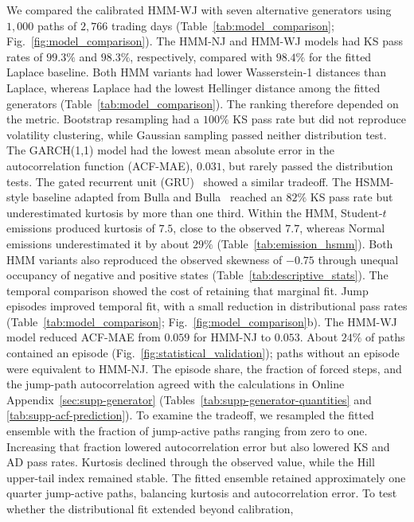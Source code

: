 We compared the calibrated HMM-WJ with seven alternative generators
using $1{,}000$ paths of $2{,}766$ trading days
(Table~\ref{tab:model_comparison}; Fig.~\ref{fig:model_comparison}).
The HMM-NJ and HMM-WJ models had KS pass rates of $99.3\%$ and
$98.3\%$, respectively, compared with $98.4\%$ for the fitted
Laplace baseline. Both HMM variants had lower Wasserstein-1 distances
than Laplace, whereas Laplace had the lowest Hellinger distance among
the fitted generators (Table~\ref{tab:model_comparison}). The
ranking therefore depended on the metric. Bootstrap resampling had a
$100\%$ KS pass rate but did not reproduce volatility clustering,
while Gaussian sampling passed neither distribution test.
The GARCH(1,1) model had the lowest mean absolute error in the
autocorrelation function (ACF-MAE), $0.031$, but rarely passed the
distribution tests. The gated recurrent unit (GRU)~\cite{choEtAl2014gru}
showed a similar tradeoff. The HSMM-style baseline adapted from Bulla
and Bulla~\cite{bullaBulla2006} reached an $82\%$ KS pass rate but
underestimated kurtosis by more than one third. Within the HMM,
Student-$t$ emissions produced kurtosis of $7.5$, close to the
observed $7.7$, whereas Normal emissions underestimated it by about
$29\%$ (Table~\ref{tab:emission_hsmm}). Both HMM variants also
reproduced the observed skewness of $-0.75$ through unequal occupancy
of negative and positive states (Table~\ref{tab:descriptive_stats}).
The temporal comparison showed the cost of retaining that marginal fit.
Jump episodes improved temporal fit, with a small reduction in
distributional pass rates (Table~\ref{tab:model_comparison};
Fig.~\ref{fig:model_comparison}b). The HMM-WJ model reduced ACF-MAE from
$0.059$ for HMM-NJ to $0.053$. About $24\%$ of paths contained an
episode (Fig.~\ref{fig:statistical_validation}); paths without an
episode were equivalent to HMM-NJ. The
episode share, the fraction of forced steps, and the jump-path
autocorrelation agreed with the calculations in Online
Appendix~\ref{sec:supp-generator}
(Tables~\ref{tab:supp-generator-quantities} and
\ref{tab:supp-acf-prediction}). To examine the tradeoff, we
resampled the fitted ensemble with the fraction of jump-active paths
ranging from zero to one. Increasing that fraction lowered
autocorrelation error but also lowered KS and AD pass rates.
Kurtosis declined through the observed value, while the Hill
upper-tail index remained stable. The fitted ensemble retained approximately one quarter jump-active
paths, balancing kurtosis and autocorrelation error.
To test whether the distributional fit extended beyond calibration,
